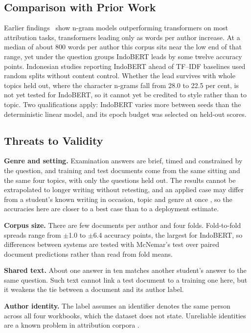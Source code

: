 \documentclass[conference]{IEEEtran}
\begin{document}
\subsection{Comparison with Prior Work}

Earlier findings~\cite{Tyo2022} show n-gram models outperforming transformers on most attribution tasks, transformers leading only as words per author increase. At a median of about 800 words per author this corpus sits near the low end of that range, yet under the question groups IndoBERT leads by some twelve accuracy points. Indonesian studies reporting IndoBERT ahead of TF--IDF baselines \cite{Saputra2023,Saputra2024} used random splits without content control. Whether the lead survives with whole topics held out, where the character n-grams fall from 28.0 to 22.5 per cent, is not yet tested for IndoBERT, so it cannot yet be credited to style rather than to topic. Two qualifications apply: IndoBERT varies more between seeds than the deterministic linear model, and its epoch budget was selected on held-out scores.

\subsection{Threats to Validity}

\textbf{Genre and setting.} Examination answers are brief, timed and constrained by the question, and training and test documents come from the same sitting and the same four topics, with only the questions held out. The results cannot be extrapolated to longer writing without retesting, and an applied case may differ from a student's known writing in occasion, topic and genre at once \cite{Barlas2021}, so the accuracies here are closer to a best case than to a deployment estimate.

\textbf{Corpus size.} There are few documents per author and four folds. Fold-to-fold spreads range from $\pm$1.0 to $\pm$6.4 accuracy points, the largest for IndoBERT, so differences between systems are tested with McNemar's test over paired document predictions rather than read from fold means.

\textbf{Shared text.} About one answer in ten matches another student's answer to the same question. Such text cannot link a test document to a training one here, but it weakens the tie between a document and its author label.

\textbf{Author identity.} The label assumes an identifier denotes the same person across all four workbooks, which the dataset does not state. Unreliable identities are a known problem in attribution corpora \cite{Bogomolov2021}.
\end{document}
